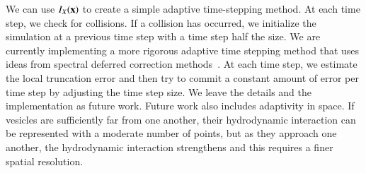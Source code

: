We can use $I_{X}({\mathbf{x}})$ to create a simple adaptive time-stepping
method.  At each time step, we check for collisions.  If a collision has
occurred, we initialize the simulation at a previous time step with a
time step half the size.  We are currently implementing a more rigorous
adaptive time stepping method that uses ideas from spectral deferred
correction methods~\cite{dut:gre:rok,hua:jia:min,min}.  At each time
step, we estimate the local truncation error and then try to commit a
constant amount of error per time step by adjusting the time step size.
We leave the details and the implementation as future work.  Future work
also includes adaptivity in space.  If vesicles are sufficiently far
from one another, their hydrodynamic interaction can be represented with
a moderate number of points, but as they approach one another, the
hydrodynamic interaction strengthens and this requires a finer spatial
resolution.

